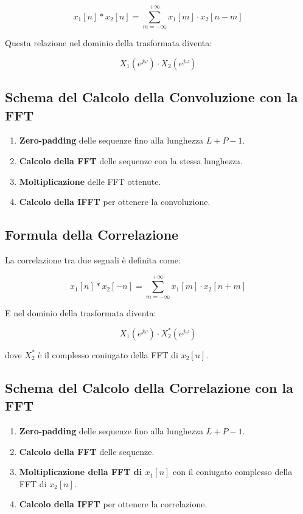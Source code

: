 \[
x_1[n] * x_2[n] = \sum_{m=-\infty}^{+\infty} x_1[m] \cdot x_2[n-m]
\]

Questa relazione nel dominio della trasformata diventa:

\[
X_1(e^{j\omega}) \cdot X_2(e^{j\omega})
\]

\subsection*{Schema del Calcolo della Convoluzione con la FFT}

\begin{enumerate}
    \item \textbf{Zero-padding} delle sequenze fino alla lunghezza \( L+P-1 \).
    \item \textbf{Calcolo della FFT} delle sequenze con la stessa lunghezza.
    \item \textbf{Moltiplicazione} delle FFT ottenute.
    \item \textbf{Calcolo della IFFT} per ottenere la convoluzione.
\end{enumerate}

\subsection*{Formula della Correlazione}

La correlazione tra due segnali è definita come:

\[
x_1[n] * x_2[-n] = \sum_{m=-\infty}^{+\infty} x_1[m] \cdot x_2[n+m]
\]

E nel dominio della trasformata diventa:

\[
X_1(e^{j\omega}) \cdot X_2^*(e^{j\omega})
\]

dove \( X_2^* \) è il complesso coniugato della FFT di \( x_2[n] \).

\subsection*{Schema del Calcolo della Correlazione con la FFT}

\begin{enumerate}
    \item \textbf{Zero-padding} delle sequenze fino alla lunghezza \( L+P-1 \).
    \item \textbf{Calcolo della FFT} delle sequenze.
    \item \textbf{Moltiplicazione della FFT di \( x_1[n] \)} con il coniugato complesso della FFT di \( x_2[n] \).
    \item \textbf{Calcolo della IFFT} per ottenere la correlazione.
\end{enumerate}

